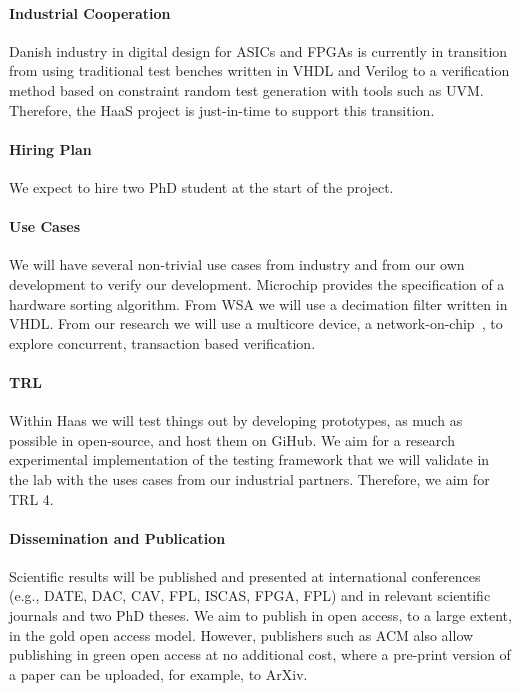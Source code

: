 \documentclass[fleqn,12pt]{article}
\begin{document}
\paragraph*{Industrial Cooperation}

Danish industry in digital design for ASICs and FPGAs is currently in transition from using traditional
test benches written in VHDL and Verilog to a verification method based on constraint random
test generation with tools such as UVM. Therefore, the HaaS project is just-in-time to support this
transition.

\paragraph{Hiring Plan} We expect to hire two PhD student at the start of the project.

\paragraph*{Use Cases}

We will have several non-trivial use cases from industry and from our own development to verify
our development.
Microchip provides the specification of a hardware sorting algorithm.
From WSA we will use a decimation filter written in VHDL.
From our research we will use a multicore device, a network-on-chip~\cite{s4noc:nocarc2019},
to explore concurrent, transaction based verification.

\paragraph*{TRL} Within Haas we will test things out by developing prototypes, as much as possible
in open-source, and host them on GiHub. We aim for a research experimental  implementation 
of the testing framework that we will validate in the lab with the uses cases from our
industrial partners. Therefore, we aim for TRL 4.


\paragraph*{Dissemination and Publication}

Scientific results will be published and presented at international
conferences (e.g., DATE, DAC, CAV, FPL, ISCAS, FPGA, FPL) and in relevant scientific journals
and two PhD theses.
We aim to publish in open access, to a large extent, in the gold open access model.
However, publishers such as ACM also allow publishing in green open access
at no additional cost, where a pre-print version of a paper can be uploaded,
for example, to ArXiv.
\end{document}
